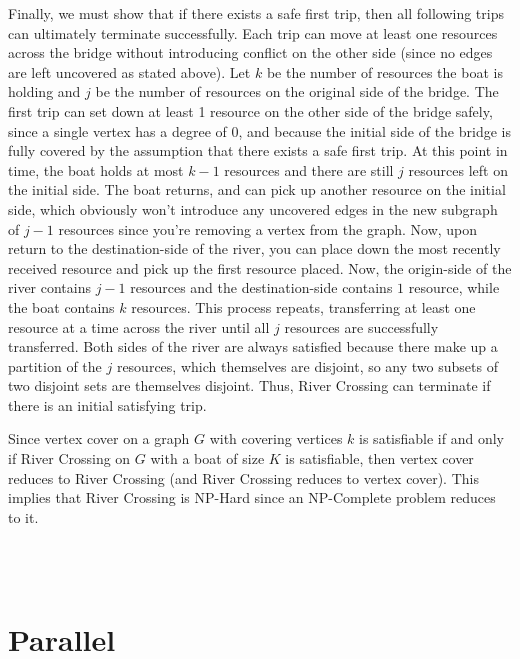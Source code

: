 \documentclass[12pt]{article}
\begin{document}
Finally, we must show that if there exists a safe first trip, then all following trips can ultimately terminate successfully. Each trip can move at least one resources across the bridge without introducing conflict on the other side (since no edges are left uncovered as stated above). Let $k$ be the number of resources the boat is holding and $j$ be the number of resources on the original side of the bridge. The first trip can set down at least 1 resource on the other side of the bridge safely, since a single vertex has a degree of 0, and because the initial side of the bridge is fully covered by the assumption that there exists a safe first trip. At this point in time, the boat holds at most $k-1$ resources and there are still $j$ resources left on the initial side. The boat returns, and can pick up another resource on the initial side, which obviously won't introduce any uncovered edges in the new subgraph of $j-1$ resources since you're removing a vertex from the graph. Now, upon return to the destination-side of the river, you can place down the most recently received resource and pick up the first resource placed. Now, the origin-side of the river contains $j-1$ resources and the destination-side contains $1$ resource, while the boat contains $k$ resources. This process repeats, transferring at least one resource at a time across the river until all $j$ resources are successfully transferred. Both sides of the river are always satisfied because there make up a partition of the $j$ resources, which themselves are disjoint, so any two subsets of two disjoint sets are themselves disjoint. Thus, River Crossing can terminate if there is an initial satisfying trip.

Since vertex cover on a graph $G$ with covering vertices $k$ is satisfiable if and only if River Crossing on $G$ with a boat of size $K$ is satisfiable, then vertex cover reduces to River Crossing (and River Crossing reduces to vertex cover). This implies that River Crossing is NP-Hard since an NP-Complete problem reduces to it.

\begin{algorithm}[H]
\\
\\
\end{algorithm}

\section*{Parallel}
\end{document}
